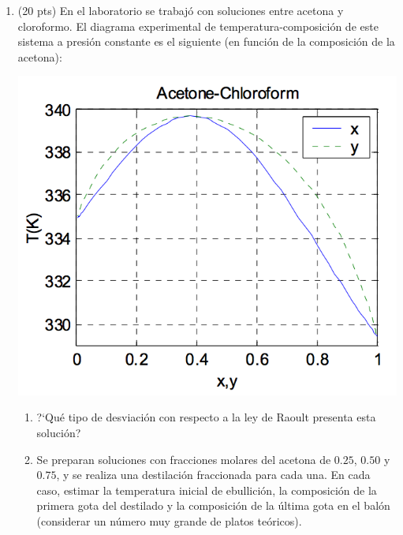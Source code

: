 \documentclass[a4paper,12pt]{article}
\begin{document}
\begin{enumerate}
 \item (20 pts) En el laboratorio se trabaj\'o con soluciones entre acetona y cloroformo. El diagrama experimental de temperatura-composici\'on de este sistema a presi\'on constante es el siguiente (en funci\'on de la composici\'on de la acetona):
\begin{center}
 \includegraphics[scale=0.6]{figure4}
\end{center}
\begin{enumerate}
 \item ?`Qu\'e tipo de desviaci\'on con respecto a la ley de Raoult presenta esta soluci\'on?
 \item Se preparan soluciones con fracciones molares del acetona de $0.25$, $0.50$ y $0.75$, y se realiza una destilaci\'on fraccionada para cada una. En cada caso, estimar la temperatura inicial de ebullici\'on, la composici\'on de la primera gota del destilado y la composici\'on de la \'ultima gota en el bal\'on (considerar un n\'umero muy grande de platos te\'oricos).
\end{enumerate} %


\end{enumerate}
\end{document}
